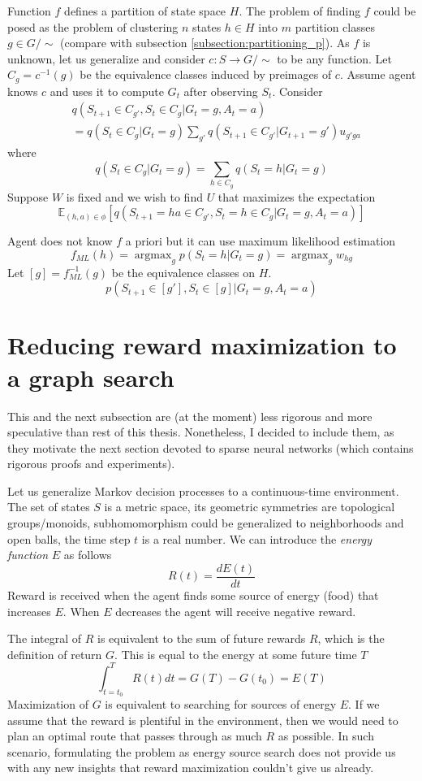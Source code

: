 \documentclass[oneside,english,logo]{amuthesis}
\DeclareMathOperator*{\argmax}{argmax}
\begin{document}
Function $f$ defines a partition of state space $H$. The problem of finding $f$ could be posed as the problem of clustering $n$ states $h\in H$ into $m$ partition classes $g\in G/{\sim}$ (compare with subsection \ref{subsection:partitioning_p}). 
As $f$ is unknown, let us generalize and consider $c:S\rightarrow G/{\sim}$ to be any function. Let $C_g=c^{-1}(g)$ be the equivalence classes induced by preimages of $c$. Assume agent knows $c$ and uses it to compute $G_t$ after observing $S_t$. Consider
\begin{align*}
&q(S_{t+1}{\in}C_{g'},S_t{\in}C_g |G_t{=}g,A_t{=}a) \\
&=q(S_t{\in} C_g|G_t{=}g)\sum_{g'}q(S_{t+1}{\in}C_{g'}|G_{t+1}{=}g')u_{g'ga}	
\end{align*}
where \[
q(S_t\in C_g|G_t{=}g) = \sum_{h\in C_g}q(S_t{=}h|G_t{=}g)
\]
Suppose $W$ is fixed and we wish to find $U$ that maximizes the expectation
\[
\mathbb{E}_{(h,a)\in \phi}[q(S_{t+1}{=}ha{\in}C_{g'},S_t{=}h{\in}C_g |G_t{=}g,A_t{=}a)]
\]

Agent does not know $f$ a priori but it can use maximum likelihood estimation\[
f_{ML}(h)=\argmax_{g}p(S_t=h|G_t=g) = \argmax_g w_{hg}
\]
Let $[g] = f^{-1}_{ML}(g)$ be the equivalence classes on $H$. 
\[
p(S_{t+1}\in[g'],S_t\in[g]|G_t=g,A_t=a)
\]
\fi

\section{Reducing reward maximization to a graph search}

This and the next subsection are (at the moment) less rigorous and more speculative than rest of this thesis. Nonetheless, I decided to include them, as they motivate the next section devoted to sparse neural networks (which contains rigorous proofs and experiments). 

Let us generalize Markov decision processes to a continuous-time environment. The set of states $S$ is a metric space, its geometric symmetries are topological groups/monoids, subhomomorphism could be generalized to neighborhoods and open balls, the time step $t$ is a real number. We can introduce the \textit{energy function} $E$ as follows
\[
R(t) = \frac{dE(t)}{dt}
\]
Reward is received when the agent finds some source of energy (food) that increases $E$. When $E$ decreases the agent will receive negative reward. 

The integral of $R$ is equivalent to the sum of future rewards $R$, which is the definition of return $G$. This is equal to the energy at some future time $T$
\[
\int_{t=t_0}^{T} R(t) dt = G(T) - G(t_0) = E(T)
\]
Maximization of $G$ is equivalent to searching for sources of energy $E$. If we assume that the reward is plentiful in the environment, then we would need to plan an optimal route that passes through as much $R$ as possible. In such scenario, formulating the problem as energy source search does not provide us with any new insights that reward maximization couldn't give us already. 
\end{document}
